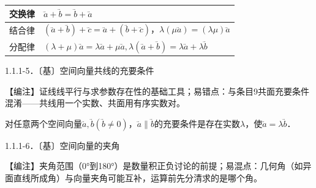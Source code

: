 {\def\LTcaptype{none} %
\begin{longtable}[]{@{}
  >{\raggedright\arraybackslash}p{}
  >{\raggedright\arraybackslash}p{}@{}}
\toprule\noalign{}
\begin{minipage}[b]{\linewidth}\raggedright
交换律
\end{minipage} & \begin{minipage}[b]{\linewidth}\raggedright
\(\overset{⃑}{a} + \overset{⃑}{b} =\)\(\overset{⃑}{b} + \overset{⃑}{a}\)
\end{minipage} \\
\midrule\noalign{}
\endhead
\bottomrule\noalign{}
\endlastfoot
结合律 &
\(\left( \overset{⃑}{a} + \overset{⃑}{b} \right) + \overset{⃑}{c} =\)\(\overset{⃑}{a} + \left( \overset{⃑}{b} + \overset{⃑}{c} \right)\)，\(\lambda(\mu\overset{⃑}{a}) =\)\((\lambda\mu)\overset{⃑}{a}\) \\
分配律 &
\((\lambda + \mu)\overset{⃑}{a} = \lambda\overset{⃑}{a} + \mu\overset{⃑}{a},\lambda(\overset{⃑}{a} + \overset{⃑}{b}) =\)\(\lambda\overset{⃑}{a} + \lambda\overset{⃑}{b}\) \\
\end{longtable}
}

1.1.1-5．〔基〕空间向量共线的充要条件

【⁠编⁠注⁠】证线线平行与求参数存在性的基础工具；易错点：与条目9共面充要条件混淆------共线用一个实数、共面用有序实数对。

对任意两个空间向量\(\overset{⃑}{a},\overset{⃑}{b}(\overset{⃑}{b} \neq 0)\)，\(\overset{⃑}{a} \parallel \overset{⃑}{b}\)的充要条件是存在实数\(\lambda\)，使\(\overset{⃑}{a} = \lambda\overset{⃑}{b}\)．

1.1.1-6．〔基〕空间向量的夹角

【⁠编⁠注⁠】夹角范围（0°到180°）是数量积正负讨论的前提；易混点：几何角（如异面直线所成角）与向量夹角可能互补，运算前先分清求的是哪个角。

